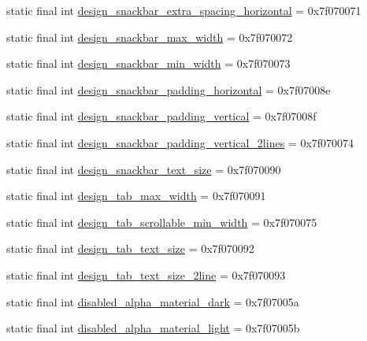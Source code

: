 \begin{CompactItemize}
static final int \hyperlink{classandroid_1_1support_1_1coreutils_1_1_r_1_1dimen_694d4dcb0c6bcdc03bc7057a79dc8288}{design\_\-snackbar\_\-extra\_\-spacing\_\-horizontal} = 0x7f070071
\item 
static final int \hyperlink{classandroid_1_1support_1_1coreutils_1_1_r_1_1dimen_99531da6561ebd66630643b3b480f2c5}{design\_\-snackbar\_\-max\_\-width} = 0x7f070072
\item 
static final int \hyperlink{classandroid_1_1support_1_1coreutils_1_1_r_1_1dimen_dc392a44dd98066116c7bc4e1fafb68e}{design\_\-snackbar\_\-min\_\-width} = 0x7f070073
\item 
static final int \hyperlink{classandroid_1_1support_1_1coreutils_1_1_r_1_1dimen_8ef300a20a0b17cf5a75e6ea00e606a4}{design\_\-snackbar\_\-padding\_\-horizontal} = 0x7f07008e
\item 
static final int \hyperlink{classandroid_1_1support_1_1coreutils_1_1_r_1_1dimen_6a522cc92397864be1fa072eb6a43efc}{design\_\-snackbar\_\-padding\_\-vertical} = 0x7f07008f
\item 
static final int \hyperlink{classandroid_1_1support_1_1coreutils_1_1_r_1_1dimen_f8a59fae4a4a53b61b9a53e75e5a38e2}{design\_\-snackbar\_\-padding\_\-vertical\_\-2lines} = 0x7f070074
\item 
static final int \hyperlink{classandroid_1_1support_1_1coreutils_1_1_r_1_1dimen_39195266b3e3dd72a0249afe66104e52}{design\_\-snackbar\_\-text\_\-size} = 0x7f070090
\item 
static final int \hyperlink{classandroid_1_1support_1_1coreutils_1_1_r_1_1dimen_03272f6d89c6a5c70e8591ae9dcff040}{design\_\-tab\_\-max\_\-width} = 0x7f070091
\item 
static final int \hyperlink{classandroid_1_1support_1_1coreutils_1_1_r_1_1dimen_fa8690697e161b30a6b76c83f657f834}{design\_\-tab\_\-scrollable\_\-min\_\-width} = 0x7f070075
\item 
static final int \hyperlink{classandroid_1_1support_1_1coreutils_1_1_r_1_1dimen_4782e481c736a934c73ca634f952805e}{design\_\-tab\_\-text\_\-size} = 0x7f070092
\item 
static final int \hyperlink{classandroid_1_1support_1_1coreutils_1_1_r_1_1dimen_88d61afeec368736570483a684ff25e8}{design\_\-tab\_\-text\_\-size\_\-2line} = 0x7f070093
\item 
static final int \hyperlink{classandroid_1_1support_1_1coreutils_1_1_r_1_1dimen_9713016dbdf2fbd5e0ff2ae59b6e5d22}{disabled\_\-alpha\_\-material\_\-dark} = 0x7f07005a
\item 
static final int \hyperlink{classandroid_1_1support_1_1coreutils_1_1_r_1_1dimen_48e6481e5c597c01c63bb04f6c63692d}{disabled\_\-alpha\_\-material\_\-light} = 0x7f07005b

\end{CompactItemize}

